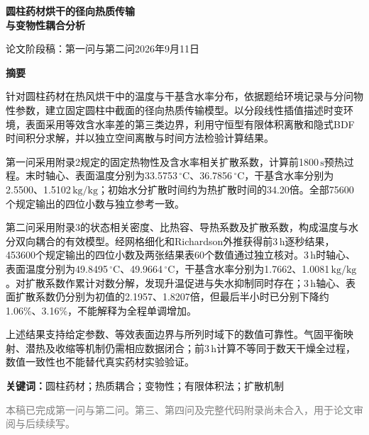 \documentclass[UTF8,a4paper,zihao=-4,fontset=windows]{ctexart}
\newcommand{\unit}[1]{\ensuremath{\,\mathrm{#1}}}
\newcommand{\celsius}{\ensuremath{\,{}^\circ\mathrm{C}}}
\begin{document}
\begin{center}
{\LARGE\bfseries 圆柱药材烘干的径向热质传输\\与变物性耦合分析\par}
\vspace{0.8em}
{\small 论文阶段稿：第一问与第二问\quad 2026年9月11日}
\end{center}
\vspace{0.5em}
\begin{center}\large\bfseries 摘\quad 要\end{center}
针对圆柱药材在热风烘干中的温度与干基含水率分布，依据题给环境记录与分问物性参数，建立固定圆柱中截面的径向热质传输模型。以分段线性插值描述时变环境，表面采用等效含水率差的第三类边界，利用守恒型有限体积离散和隐式BDF时间积分求解，并以独立空间离散与时间方法检验计算结果。

第一问采用附录2规定的固定热物性及含水率相关扩散系数，计算前1800\unit{s}预热过程。末时轴心、表面温度分别为33.5753\celsius、36.7856\celsius，干基含水率分别为2.5500、1.5102\unit{kg/kg}；初始水分扩散时间约为热扩散时间的34.20倍。全部75600个规定输出的四位小数与独立参考一致。

第二问采用附录3的状态相关密度、比热容、导热系数及扩散系数，构成温度与水分双向耦合的有效模型。经网格细化和Richardson外推获得前3\unit{h}逐秒结果，453600个规定输出的四位小数及两张结果表60个数值通过独立核对。3\unit{h}时轴心、表面温度分别为49.8495\celsius、49.9664\celsius，干基含水率分别为1.7662、1.0081\unit{kg/kg}。对扩散系数作累计对数分解，发现升温促进与失水抑制同时存在；3\unit{h}轴心、表面扩散系数仍分别为初值的2.1957、1.8207倍，但最后半小时已分别下降约1.06\%、3.16\%，不能解释为全程单调增加。

上述结果支持给定参数、等效表面边界与所列时域下的数值可靠性。气固平衡映射、潜热及收缩等机制仍需相应数据闭合；前3\unit{h}计算不等同于数天干燥全过程，数值一致性也不能替代真实药材实验验证。

\vspace{0.5em}
\noindent\textbf{关键词：}圆柱药材；热质耦合；变物性；有限体积法；扩散机制

\vfill
\noindent\small\textcolor{gray}{本稿已完成第一问与第二问。第三、第四问及完整代码附录尚未合入，用于论文审阅与后续续写。}
\clearpage
\normalsize




\FloatBarrier



\FloatBarrier
\end{document}
